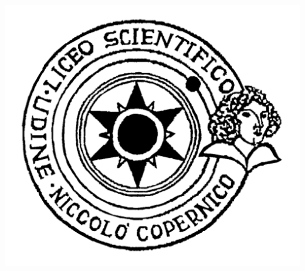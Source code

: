 \documentclass[italian,A4,12pt]{article}
\begin{document}
\begin{titlepage}
\includegraphics[scale=0.2]{logo.png}\\[1cm] %


\vfill %

\end{titlepage}
  \newpage
  \tableofcontents
  \newpage
\end{document}
